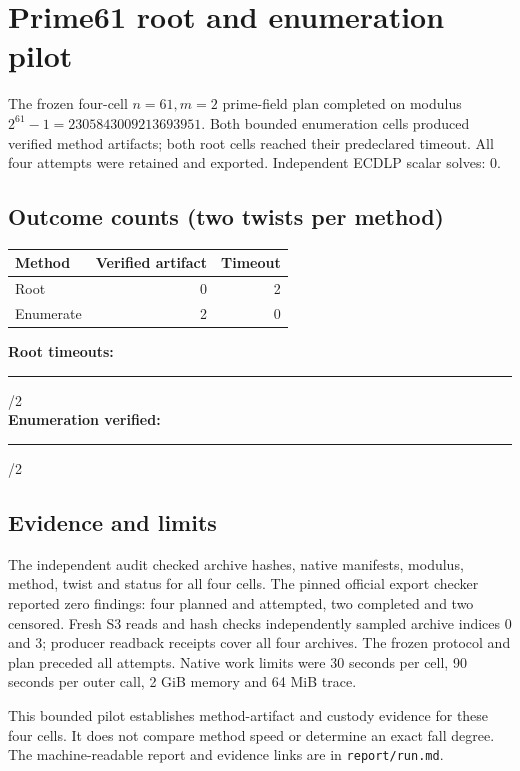 \documentclass[10pt]{article}
\begin{document}
\section*{Prime61 root and enumeration pilot}
The frozen four-cell $n=61,m=2$ prime-field plan completed on modulus
$2^{61}-1=2305843009213693951$. Both bounded enumeration cells produced
verified method artifacts; both root cells reached their predeclared timeout.
All four attempts were retained and exported. Independent ECDLP scalar solves: 0.

\subsection*{Outcome counts (two twists per method)}
\noindent\begin{tabular}{lrr}
Method & Verified artifact & Timeout\\\hline
Root & 0 & 2\\
Enumerate & 2 & 0
\end{tabular}

\vspace{1em}\noindent\textbf{Root timeouts:}\quad\rule{2in}{10pt}/2\\[8pt]
\textbf{Enumeration verified:}\quad\rule{2in}{10pt}/2

\subsection*{Evidence and limits}
The independent audit checked archive hashes, native manifests, modulus,
method, twist and status for all four cells. The pinned official export checker
reported zero findings: four planned and attempted, two completed and two
censored. Fresh S3 reads and hash checks independently sampled archive indices
0 and 3; producer readback receipts cover all four archives. The frozen
protocol and plan preceded all attempts. Native work limits were 30 seconds per
cell, 90 seconds per outer call, 2 GiB memory and 64 MiB trace.

This bounded pilot establishes method-artifact and custody evidence for these
four cells. It does not compare method speed or determine an exact fall degree.
The machine-readable report and evidence links are in \texttt{report/run.md}.
\end{document}
